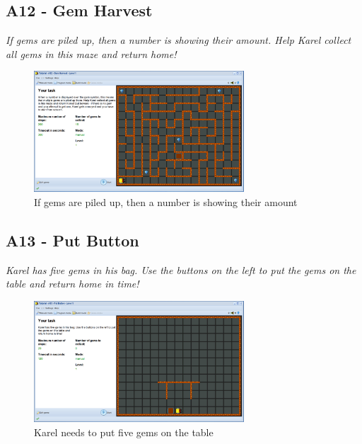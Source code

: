 \documentclass[article,A4,12pt]{llncs}
\begin{document}
\subsection{A12 - Gem Harvest}

{\em If gems are piled up, then a number is showing their amount. 
Help Karel collect all gems in this maze and return home!}\\[-7mm]

\begin{figure}[!ht]
\begin{center}
\includegraphics[width=0.7\textwidth]{img/a12.png}
\end{center}
\vspace{-4mm}
\caption{If gems are piled up, then a number is showing their amount}
\label{fig:a12}
\vspace{-4mm}
\end{figure}
\noindent


\subsection{A13 - Put Button}

{\em Karel has five gems in his bag. Use the buttons on the left to put the gems on the table and 
return home in time!}\\[-7mm]

\begin{figure}[!ht]
\begin{center}
\includegraphics[width=0.7\textwidth]{img/a13.png}
\end{center}
\vspace{-4mm}
\caption{Karel needs to put five gems on the table}
\label{fig:a13}
\vspace{-4mm}
\end{figure}
\noindent
\newpage
\end{document}
